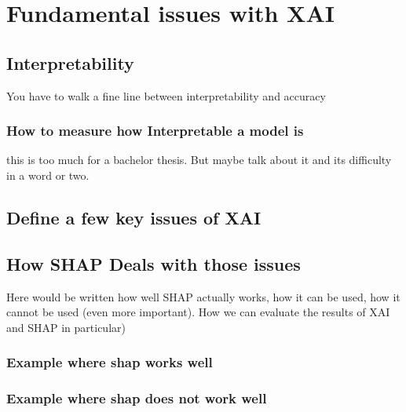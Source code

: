 
\chapter{Fundamental issues with XAI}
\label{ch:Conclusion}

\section{Interpretability}

You have to walk a fine line between interpretability and accuracy

\subsection{How to measure how Interpretable a model is}

this is too much for a bachelor thesis. But maybe talk about it and its difficulty in a word or two.


\section{Define a few key issues of XAI}

\section{How SHAP Deals with those issues}

Here would be written how well SHAP actually works, how it can be used, how it cannot be used (even more important). How we can evaluate the results of XAI and SHAP in particular)

\subsection{Example where shap works well}
\subsection{Example where shap does not work well}